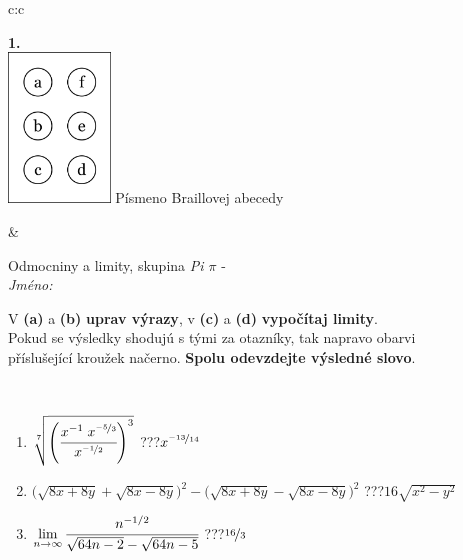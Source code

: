 \documentclass[10pt]{report}
\begin{document}
\begin{tabular}{c:c}
\begin{minipage}[c][104.5mm][t]{0.5\linewidth}
\begin{center}
\begin{minipage}{0.20\linewidth}
\begin{center}
{\Huge\bfseries 1.} \\[2mm]
\includegraphics[height=40mm]{../images/braille.png}
{\small Písmeno Braillovej abecedy}
\end{center}
\end{minipage}
\end{center}
\end{minipage}
&
\begin{minipage}[c][104.5mm][t]{0.5\linewidth}
\begin{center}
\vspace{7mm}
{\huge Odmocniny a limity, skupina \textit{Pi $\pi$} -}\\[5mm]
\textit{Jméno:}\phantom{xxxxxxxxxxxxxxxxxxxxxxxxxxxxxxxxxxxxxxxxxxxxxxxxxxxxxxxxxxxxxxxxx}\\[5mm]
\begin{minipage}{0.95\linewidth}
\begin{center}
V \textbf{(a)} a \textbf{(b)} \textbf{uprav výrazy}, v \textbf{(c)} a \textbf{(d)} \textbf{vypočítaj limity}.\\Pokud se výsledky shodujú s tými za otazníky, tak napravo obarvi\\příslušející kroužek načerno. \textbf{Spolu odevzdejte výsledné slovo}.
\end{center}
\end{minipage}
\\[1mm]
\begin{minipage}{0.79\linewidth}
\begin{center}
\begin{varwidth}{\linewidth}
\begin{enumerate}
\small
\item $\sqrt[7]{\left(\cfrac{x^{-1}\;x^{\nicefrac{-5}{3}}}{x^{\nicefrac{-1}{2}}}\right)^{3}}$\quad \dotfill\; ???\;\dotfill \quad $x^{\nicefrac{-13}{14}}$
\item {\footnotesize{\scriptsize$\big(\sqrt{8x+8y}+\sqrt{8x-8y}\big)^2-\big(\sqrt{8x+8y}-\sqrt{8x-8y}\big)^2$}\quad \dotfill\; ???\;\dotfill \quad $16\sqrt{x^2-y^2}$}
\item $\lim\limits_{n\to\infty}\cfrac{n^{-1/2}}{\sqrt{64n-2}-\sqrt{64n-5}}$\quad \dotfill\; ???\;\dotfill \quad $\nicefrac{16}{3}$

\end{enumerate}
\end{varwidth}
\end{center}
\end{minipage}
\end{center}
\end{minipage}
\end{tabular}
\end{document}
